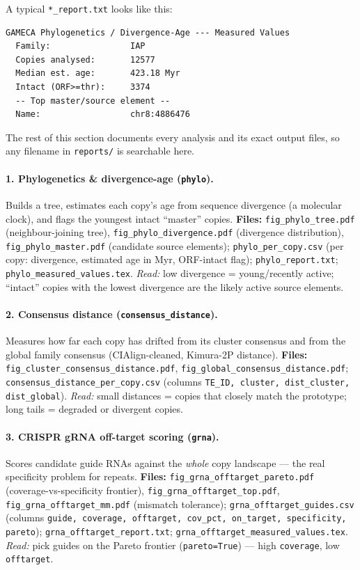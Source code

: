 \documentclass[11pt]{article}
\begin{document}
\noindent A typical \texttt{*\_report.txt} looks like this:

\begin{lstlisting}
GAMECA Phylogenetics / Divergence-Age --- Measured Values
  Family:                IAP
  Copies analysed:       12577
  Median est. age:       423.18 Myr
  Intact (ORF>=thr):     3374
  -- Top master/source element --
  Name:                  chr8:4886476
\end{lstlisting}

\noindent The rest of this section documents every analysis and its exact
output files, so any filename in \texttt{reports/} is searchable here.

\paragraph{1. Phylogenetics \& divergence-age (\texttt{phylo}).}
Builds a tree, estimates each copy's age from sequence divergence (a
molecular clock), and flags the youngest intact ``master'' copies.
\textbf{Files:} \texttt{fig\_phylo\_tree.pdf} (neighbour-joining tree),
\texttt{fig\_phylo\_divergence.pdf} (divergence distribution),
\texttt{fig\_phylo\_master.pdf} (candidate source elements);
\texttt{phylo\_per\_copy.csv} (per copy: divergence, estimated age in Myr,
ORF-intact flag); \texttt{phylo\_report.txt}; \texttt{phylo\_measured\_values.tex}.
\emph{Read:} low divergence = young/recently active; ``intact'' copies
with the lowest divergence are the likely active source elements.

\paragraph{2. Consensus distance (\texttt{consensus\_distance}).}
Measures how far each copy has drifted from its cluster consensus and from
the global family consensus (CIAlign-cleaned, Kimura-2P distance).
\textbf{Files:} \texttt{fig\_cluster\_consensus\_distance.pdf},
\texttt{fig\_global\_consensus\_distance.pdf};
\texttt{consensus\_distance\_per\_copy.csv} (columns
\texttt{TE\_ID, cluster, dist\_cluster, dist\_global}).
\emph{Read:} small distances = copies that closely match the prototype;
long tails = degraded or divergent copies.

\paragraph{3. CRISPR gRNA off-target scoring (\texttt{grna}).}
Scores candidate guide RNAs against the \emph{whole} copy landscape ---
the real specificity problem for repeats.
\textbf{Files:} \texttt{fig\_grna\_offtarget\_pareto.pdf}
(coverage-vs-specificity frontier), \texttt{fig\_grna\_offtarget\_top.pdf},
\texttt{fig\_grna\_offtarget\_mm.pdf} (mismatch tolerance);
\texttt{grna\_offtarget\_guides.csv} (columns \texttt{guide, coverage,
offtarget, cov\_pct, on\_target, specificity, pareto});
\texttt{grna\_offtarget\_report.txt}; \texttt{grna\_offtarget\_measured\_values.tex}.
\emph{Read:} pick guides on the Pareto frontier (\texttt{pareto=True}) ---
high \texttt{coverage}, low \texttt{offtarget}.
\end{document}
